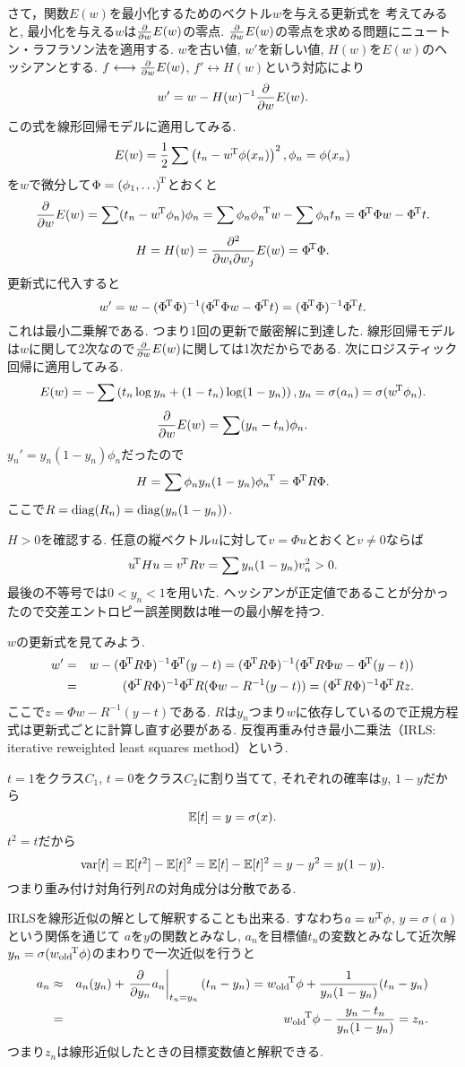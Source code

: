 さて，関数$E(w)$を最小化するためのベクトル$w$を与える更新式を
考えてみると, 最小化を与える$w$は$\frac{\partial}{\partial w}E(w)$の零点.
$\frac{\partial}{\partial w}E(w)$の零点を求める問題にニュートン・ラフラソン法を適用する.
$w$を古い値, $w'$を新しい値, $H(w)$を$E(w)$のヘッシアンとする.
$f \longleftrightarrow \frac{\partial}{\partial w}E(w)$, $f' \longleftrightarrow H(w)$という対応により
$$
w'=w-H(w)^{-1}\frac{\partial}{\partial w}E(w).
$$
この式を線形回帰モデルに適用してみる.
$$
E(w)=\frac{1}{2}\sum\left(t_n-{w}^{\!\mathrm{T}}\phi(x_n)\right)^2, \phi_n=\phi(x_n)
$$
を$w$で微分して$\Phi={(\phi_1, \ldots)}^{\!\mathrm{T}}$とおくと
$$
\frac{\partial}{\partial w}E(w)=\sum(t_n-{w}^{\!\mathrm{T}}\phi_n)\phi_n=\sum \phi_n {\phi_n}^{\!\mathrm{T}}w-\sum \phi_n t_n={\Phi}^{\!\mathrm{T}} \Phi w-{\Phi}^{\!\mathrm{T}} t.
$$
$$
H=H(w)=\frac{\partial^2}{\partial w_i \partial w_j}E(w)={\Phi}^{\!\mathrm{T}} \Phi.
$$
更新式に代入すると
$$
w'=w-({\Phi}^{\!\mathrm{T}} \Phi)^{-1}({\Phi}^{\!\mathrm{T}} \Phi w-{\Phi}^{\!\mathrm{T}} t)=({\Phi}^{\!\mathrm{T}} \Phi)^{-1}{\Phi}^{\!\mathrm{T}} t.
$$
これは最小二乗解である. つまり1回の更新で厳密解に到達した. 線形回帰モデルは$w$に関して2次なので$\frac{\partial}{\partial w}E(w)$に関しては1次だからである.
次にロジスティック回帰に適用してみる.
$$
E(w)=-\sum\left(t_n \log y_n + (1-t_n)\log (1-y_n)\right), y_n=\sigma(a_n)=\sigma({w}^{\!\mathrm{T}}\phi_n).
$$
$$
\frac{\partial}{\partial w}E(w)=\sum (y_n-t_n)\phi_n.
$$
$y_n'=y_n(1-y_n)\phi_n$だったので
$$
H=\sum \phi_n y_n(1-y_n){\phi_n}^{\!\mathrm{T}}={\Phi}^{\!\mathrm{T}} R\Phi.
$$
ここで$R=\mathop{\mathrm{diag}}\nolimits(R_n)=\mathop{\mathrm{diag}}\nolimits(y_n(1-y_n))$.

$H>0$を確認する.
任意の縦ベクトル$u$に対して$v=\Phi u$とおくと$v\ne 0$ならば
$$
{u}^{\!\mathrm{T}}H u={v}^{\!\mathrm{T}}R v=\sum y_n(1-y_n)v_n^2 > 0.
$$
最後の不等号では$0<y_n<1$を用いた. ヘッシアンが正定値であることが分かったので交差エントロピー誤差関数は唯一の最小解を持つ.

$w$の更新式を見てみよう.
\begin{eqnarray*}
w'
 &=& w-(\PhiT R\Phi)^{-1}\PhiT(y-t)
 = (\PhiT R\Phi)^{-1}(\PhiT R\Phi w - \PhiT(y-t))\\
 &=& (\PhiT R\Phi)^{-1}\PhiT R(\Phi w - R^{-1}(y-t))
 = (\PhiT R\Phi)^{-1}\PhiT Rz.
\end{eqnarray*}
ここで$z=\Phi w - R^{-1}(y-t)$である.
$R$は$y_n$つまり$w$に依存しているので正規方程式は更新式ごとに計算し直す必要がある.
反復再重み付き最小二乗法（IRLS: iterative reweighted least squares method）という.

$t=1$をクラス$C_1$, $t=0$をクラス$C_2$に割り当てて, それぞれの確率は$y$, $1-y$だから
$$
\mathbb{E}[t]=y=\sigma(x).
$$
$t^2=t$だから
$$
\mathop{\mathrm{var}}\nolimits[t]=\mathbb{E}[t^2]-\mathbb{E}[t]^2=\mathbb{E}[t]-\mathbb{E}[t]^2=y-y^2=y(1-y).
$$
つまり重み付け対角行列$R$の対角成分は分散である.

IRLSを線形近似の解として解釈することも出来る. すなわち$a={w}^{\!\mathrm{T}}\phi$, $y=\sigma(a)$という関係を通じて
$a$を$y$の関数とみなし,
$a_n$を目標値$t_n$の変数とみなして近次解$y_n=\sigma({w_{\text {old}}}^{\!\mathrm{T}}\phi)$のまわりで一次近似を行うと
\begin{eqnarray*}
a_n &\approx& a_n(y_n)+\left.\frac{\partial}{\partial y_n} a_n \right|_{t_n=y_n}(t_n-y_n)
 = {w_{\text {old}}}^{\!\mathrm{T}}\phi + \frac{1}{y_n(1-y_n)}(t_n-y_n)\\
 &=& {w_{\text {old}}}^{\!\mathrm{T}}\phi - \frac{y_n-t_n}{y_n(1-y_n)}
 = z_n.
\end{eqnarray*}
つまり$z_n$は線形近似したときの目標変数値と解釈できる.

